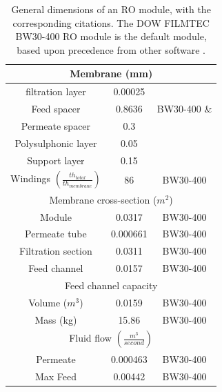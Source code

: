 \begin{supplementary}
\begin{savenotes}
\begin{table}[!h]
\begin{tabular}{|c|c|c|}
        \multicolumn{3}{c}{Membrane (mm)} \\ \midrule
        filtration layer & 0.00025 & \cite{Pacheco2010CharacterizationTechniques,Jeong2007InterfacialMembranes} \\
        Feed spacer & 0.8636 & BW30-400 \cite{2020FilmTecElement} \& \cite{Sablani2002InfluenceSystems} \\
        Permeate spacer & 0.3 & \\
        Polysulphonic layer & 0.05 &  \\
        Support layer & 0.15 &  \\
        Windings $\left( \frac{th_{total}}{th_{membrane}} \right) $ & 86 & BW30-400 \\ \midrule
        
        \multicolumn{3}{c}{Membrane cross-section ($m^2$)} \\ \midrule
        Module & 0.0317 & BW30-400 \cite{2020FilmTecElement}\\
        Permeate tube & 0.000661 & BW30-400 \cite{2020FilmTecElement}\\
        Filtration section & 0.0311 & BW30-400 \cite{2020FilmTecElement}\\
        Feed channel & 0.0157 & BW30-400 \cite{2020FilmTecElement}\\ \midrule
        
        \multicolumn{3}{c}{Feed channel capacity} \\ \midrule 
        Volume ($m^3$) & 0.0159 & BW30-400 \cite{2020FilmTecElement}\\
        Mass (kg) & 15.86 & BW30-400 \cite{2020FilmTecElement}\\ \midrule

        \multicolumn{3}{c}{Fluid flow $\left( \frac{m^3}{second} \right) $} \\ \midrule
        Permeate & 0.000463 & BW30-400 \cite{2020FilmTecElement}\\
        Max Feed & 0.00442 & BW30-400 \cite{2020FilmTecElement}\\ \bottomrule
        
    \end{tabular}
    
    \caption{
        General dimensions of an RO module, with the corresponding citations. The DOW FILMTEC BW30-400 RO module is the default module, based upon precedence from other software \cite{Li2012OptimalDesalination}.
    }
    \label{RO_dimensions}
\end{table}
\end{savenotes}


\end{supplementary}
